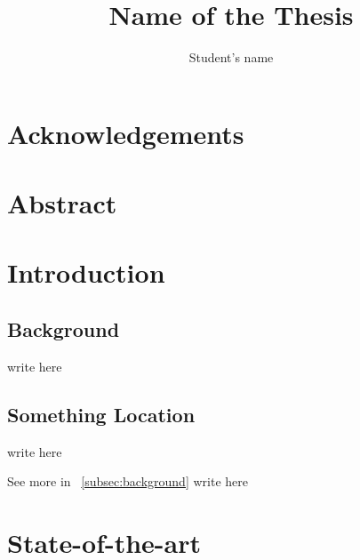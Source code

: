 \documentclass[12pt,twoside]{report}
\title{\textbf{Name of the Thesis}}
\author{Student's name}
\begin{document}

\clearpage

\chapter*{Acknowledgements}
{

}

\chapter*{Abstract}
{

}

\tableofcontents
\clearpage

\listoffigures
{}

\listoftables
{}

\pagestyle{fancy}
\fancyhf{}
\fancyhead[LE,RO]{\nouppercase{\leftmark}}
\fancyhead[RE,LO]{\nouppercase{\rightmark}}
\fancyfoot[LE,RO]{\thepage}
\renewcommand{\headrulewidth}{1.0pt}

\chapter{Introduction}
\label{ch:introduction}
\setcounter{page}{1}




	\section{Background}
	\label{subsec:background}
	write here

	\section{Something Location}
	\label{subsec:somelocation}

	write here

	See more in ~\autoref{subsec:background}
	write here
	
	\begin{center}
	\end{center}
	
\chapter{State-of-the-art}
\label{ch:stateart}
\end{document}
